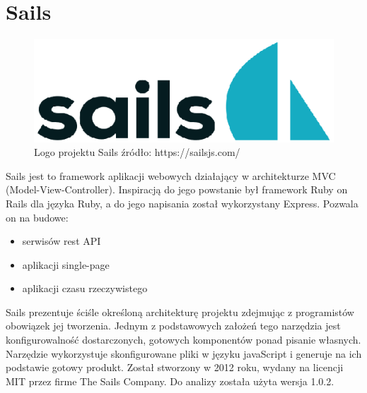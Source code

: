 \documentclass[12pt]{report}
\begin{document}
   \section{Sails}
    \begin{figure}[!hb]
      \centering
      \includegraphics[width=\textwidth,height=\textheight,keepaspectratio]{logo_sails.png} 
      \caption{Logo projektu Sails \newline źródło: https://sailsjs.com/}
    \end{figure}
    Sails jest to framework aplikacji webowych działający w architekturze MVC (Model-View-Controller).
    Inspiracją do jego powstanie był framework Ruby on Rails dla języka Ruby, a do jego napisania został wykorzystany Express.
    Pozwala on na budowe:
     \begin{itemize}
      \item serwisów rest API
      \item aplikacji single-page 
      \item aplikacji czasu rzeczywistego
    \end{itemize} 
    Sails prezentuje ściśle określoną architekturę projektu zdejmując z programistów obowiązek jej tworzenia.
    Jednym z podstawowych założeń tego narzędzia jest konfigurowalność dostarczonych, gotowych komponentów ponad pisanie własnych.
    Narzędzie wykorzystuje skonfigurowane pliki w języku javaScript i generuje na ich podstawie gotowy produkt.
    Został stworzony w 2012 roku, wydany na licencji MIT przez firme The Sails Company.
    Do analizy została użyta wersja 1.0.2.
\end{document}
